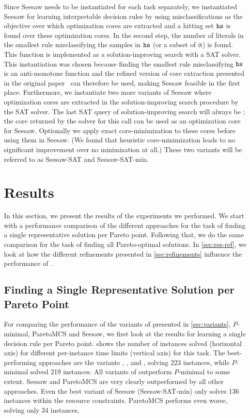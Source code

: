 Since Seesaw needs to be instantiated for each task separately, we instantiated Seesaw for learning interpretable decision rules by using misclassifications as the objective over which optimization cores are extracted and a hitting set $\texttt{hs}$ is found over these optimization cores.
In the second step, the number of literals in the smallest rule misclassifying the samples in $\texttt{hs}$ (or a subset of it) is found.
This function is implemented as a solution-improving search with a SAT solver.
This instantiation was chosen because finding the smallest rule misclassifying $\texttt{hs}$ is an anti-monotone function and the refined version of core extraction presented in the original paper~\autocite{DBLP:conf/cp/JanotaMSM21} can therefore be used, making Seesaw feasible in the first place.
Furthermore, we instantiate two more variants of Seesaw where optimization cores are extracted in the solution-improving search procedure by the SAT solver.
The last SAT query of solution-improving search will always be \unsat{};
the core returned by the solver for this call can be used as an optimization core for Seesaw.
Optionally we apply exact core-minimization to these cores before using them in Seesaw.
(We found that heuristic core-minimization leads to no significant improvement over no minimization at all.)
These two variants will be referred to as Seesaw-SAT and Seesaw-SAT-min.

\section{Results\label{sec:results}}

In this section, we present the results of the experiments we performed.
We start with a performance comparison of the different approaches for the task of finding a single representative solution per Pareto point.
Following that, we do the same comparison for the task of finding all Pareto-optimal solutions.
In \cref{sec:res-ref}, we look at how the different refinements presented in \cref{sec:refinements} influence the performance of \algname{}.

\subsection{Finding a Single Representative Solution per Pareto Point}

For comparing the performance of the variants of \algname{} presented in \cref{sec:variants}, $P$-minimal, ParetoMCS and Seesaw, we first look at the results for learning a single decision rule per Pareto point.
 shows the number of instances solved (horizontal axis) for different per-instance time limits (vertical axis) for this task.
The best-performing approaches are the \algname{} variants \msh{}, \satunsat{}, \unsatsat{} and \msu{}, solving 223 instances, while $P$-minimal solved 219 instances.
All variants of \algname{} outperform $P$-minimal to some extent.
Seesaw and ParetoMCS are very clearly outperformed by all other approaches.
Even the best variant of Seesaw (Seesaw-SAT-min) only solves 136 instances within the resource constraints.
ParetoMCS performs even worse, solving only 34 instances.

